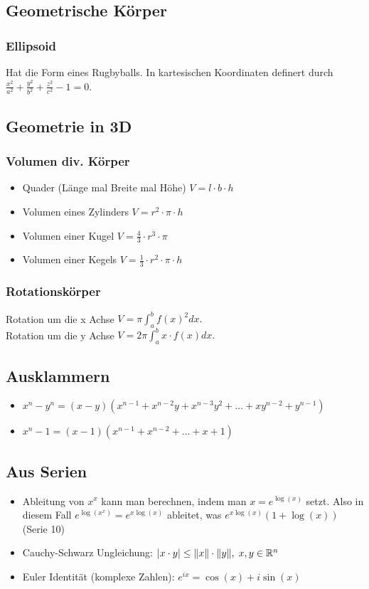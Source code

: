 \subsection{Geometrische Körper}
\subsubsection{Ellipsoid}
Hat die Form eines Rugbyballs. In kartesischen Koordinaten definert durch
$\frac{x^2}{a^2} + \frac{y^2}{b^2} + \frac{z^2}{c^2} - 1 = 0$.

\subsection{Geometrie in 3D}
\subsubsection{Volumen div. Körper}
\begin{itemize}[leftmargin=*]
   \item Quader (Länge mal Breite mal Höhe) $V = l \cdot b \cdot h$
   \item Volumen eines Zylinders $V = r^2 \cdot \pi \cdot h$
   \item Volumen einer Kugel  $V = \frac{4}{3} \cdot r^3 \cdot \pi$
   \item Volumen einer Kegels  $V = \frac{1}{3} \cdot r^2 \cdot \pi \cdot h$
\end{itemize}
 \subsubsection{Rotationskörper}
 Rotation um die x Achse $V=\pi \int_a^b f(x)^2 dx.$\\
 Rotation um die y Achse $V=2\pi \int_a^b x \cdot f(x) dx.$

\subsection{Ausklammern}
\begin{itemize}[leftmargin=*]
	\item $x^n - y^n = (x-y) (x^{n-1} + x^{n-2}y + x^{n-3}y^2 + \ldots + xy^{n-2}
	+ y^{n-1})$
	\item $x^n - 1 = (x-1)(x^{n-1} + x^{n-2} + \ldots + x + 1)$
\end{itemize}

\subsection{Aus Serien}
\begin{itemize}[leftmargin=*]
	\item Ableitung von $x^x$ kann man berechnen, indem man $x = e^{\log(x)}$
	setzt. Also in diesem Fall $e^{\log(x^x)} = e^{x \log(x)}$ ableitet, was $e^{x
	\log(x)} (1 + \log(x))$ (Serie 10)
	\item Cauchy-Schwarz Ungleichung: $|x \cdot y| \leq \|x\| \cdot \|y\|, \; x,y \in \mathbb{R}^n$
	\item Euler Identität (komplexe Zahlen): $e^{ix} = \cos(x) + i \sin(x)$
\end{itemize}

